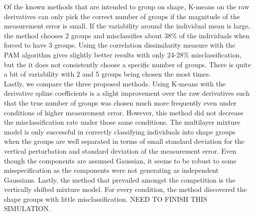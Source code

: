 \documentclass[12pt]{article}
\begin{document}
Of the known methods that are intended to group on shape, K-means on the raw derivatives can only pick the correct number of groups if the magnitude of the measurement error is small. If the variability around the individual mean is large, the method chooses 2 groups and misclassifies about 38\% of the individuals when forced to have 3 groups. Using the correlation dissimilarity measure with the PAM algorithm gives slightly better results with only 24-28\% misclassification, but the it does not consistently choose a specific number of groups. There is quite a bit of variability with 2 and 5 groups being chosen the most times.\\
Lastly, we compare the three proposed methods. Using K-means with the derivative spline coefficients is a slight improvement over the raw derivatives such that the true number of groups was chosen much more frequently even under conditions of higher measurement error. However, this method did not decrease the misclassification rate under those same conditions. The multilayer mixture model is only successful in correctly classifying individuals into shape groups when the groups are well separated in terms of small standard deviation for the vertical perturbation and standard deviation of the measurement error. Even though the components are assumed Gaussian, it seems to be robust to some misspecification as the components were not generating as independent Gaussians. Lastly, the method that prevailed amongst the competition is the vertically shifted mixture model. For every condition, the method discovered the shape groups with little misclassification. NEED TO FINISH THIS SIMULATION.
\end{document}
